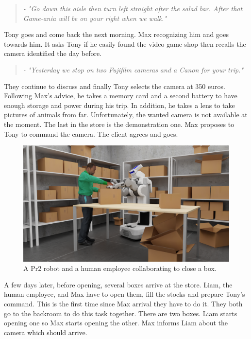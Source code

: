 \begin{quote} 
\centering 
\textit{
- "Go down this aisle then turn left straight after the salad bar. After that Game-ania will be on your right when we walk."}
\end{quote}

Tony goes and come back the next morning. Max recognizing him and goes towards him. It asks Tony if he easily found the video game shop then recalls the camera identified the day before.

\begin{quote} 
\centering 
\textit{
- "Yesterday we stop on two Fujifilm cameras and a Canon for your trip."}
\end{quote}

They continue to discuss and finally Tony selects the camera at 350 euros. Following Max's advice, he takes a memory card and a second battery to have enough storage and power during his trip. In addition, he takes a lens to take pictures of animals from far. Unfortunately, the wanted camera is not available at the moment. The last in the store is the demonstration one. Max proposes to Tony to command the camera. The client agrees and goes.

\begin{figure}[ht!]
\centering
\includegraphics[width=\textwidth]{figures/introduction/camera_store_4.png}
\caption{\label{fig:cam_back} A Pr2 robot and a human employee collaborating to close a box. }
\end{figure}

A few days later, before opening, several boxes arrive at the store. Liam, the human employee, and Max have to open them, fill the stocks and prepare Tony's command. This is the first time since Max arrival they have to do it. They both go to the backroom to do this task together. There are two boxes. Liam starts opening one so Max starts opening the other. Max informs Liam about the camera which should arrive.

